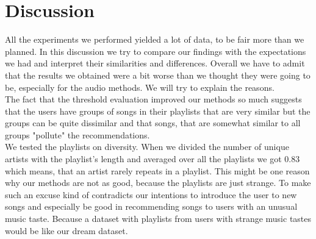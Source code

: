 \section{Discussion}\label{sec:discussion}

All the experiments we performed yielded a lot of data, to be fair more than we planned. In this discussion we try to compare our findings with the expectations we had and interpret their similarities and differences. Overall we have to admit that the results we obtained were a bit worse than we thought they were going to be, especially for the audio methods. We will try to explain the reasons. \\
The fact that the threshold evaluation improved our methods so much suggests that the users have groups of songs in their playlists that are very similar but the groups can be quite dissimilar and that songs, that are somewhat similar to all groups "pollute" the recommendations. \\
We tested the playlists on diversity. When we divided the number of unique artists with the playlist's length and averaged over all the playlists we got 0.83 which means, that an artist rarely repeats in a playlist. This might be one reason why our methods are not as good, because the playlists are just strange. To make such an excuse kind of contradicts our intentions to introduce the user to new songs and especially be good in recommending songs to users with an unusual music taste. Because a dataset with playlists from users with strange music tastes would be like our dream dataset. \\

